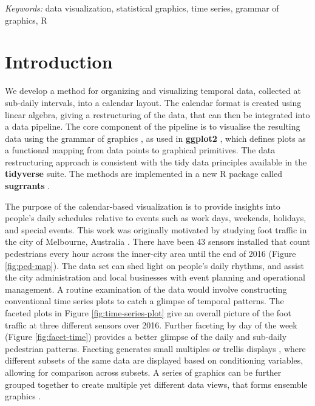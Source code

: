 \documentclass[12pt]{article}
\begin{document}
\noindent%
{\it Keywords:} data visualization, statistical graphics, time series, grammar of graphics, R
\vfill

\newpage
{} %

\hypertarget{introduction}{%
\section{Introduction}\label{introduction}}

We develop a method for organizing and visualizing temporal data, collected at sub-daily intervals, into a calendar layout. The calendar format is created using linear algebra, giving a restructuring of the data, that can then be integrated into a data pipeline. The core component of the pipeline is to visualise the resulting data using the grammar of graphics \citep{wilkinson2006grammar, wickham2009ggplot2}, as used in \textbf{ggplot2} \citep{R-ggplot2}, which defines plots as a functional mapping from data points to graphical primitives. The data restructuring approach is consistent with the tidy data principles available in the \textbf{tidyverse} \citep{R-tidyverse} suite. The methods are implemented in a new R package called \textbf{sugrrants} \citep{R-sugrrants}.

The purpose of the calendar-based visualization is to provide insights into people's daily schedules relative to events such as work days, weekends, holidays, and special events. This work was originally motivated by studying foot traffic in the city of Melbourne, Australia \citep{ped}. There have been 43 sensors installed that count pedestrians every hour across the inner-city area until the end of 2016 (Figure \ref{fig:ped-map}). The data set can shed light on people's daily rhythms, and assist the city administration and local businesses with event planning and operational management. A routine examination of the data would involve constructing conventional time series plots to catch a glimpse of temporal patterns. The faceted plots in Figure \ref{fig:time-series-plot} give an overall picture of the foot traffic at three different sensors over 2016. Further faceting by day of the week (Figure \ref{fig:facet-time}) provides a better glimpse of the daily and sub-daily pedestrian patterns. Faceting generates small multiples \citep{tufte1983visual} or trellis displays \citep{becker_visual_1996}, where different subsets of the same data are displayed based on conditioning variables, allowing for comparison across subsets. A series of graphics can be further grouped together to create multiple yet different data views, that forms ensemble graphics \citep{unwin_ensemble_2018}.
\end{document}
